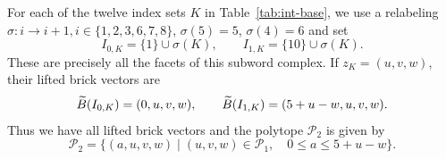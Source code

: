 For each of the twelve index sets $K$ in Table~\ref{tab:int-base}, we use
a relabeling $\sigma:i\to i+1, i\in\{1,2,3,6,7,8\}$, $\sigma(5)=5$, $\sigma(4)=6$ and set
\[
I_{0,K}=\{1\}\cup\sigma(K),\qquad
I_{1,K}=\{10\}\cup\sigma(K).
\]
These are precisely all the facets of this subword complex. If $z_K=(u,v,w)$, their lifted
brick vectors are
\begin{equation}\label{eq:int-small-vertices}
\widetilde B(I_{0,K})=(0,u,v,w),\qquad
\widetilde B(I_{1,K})=(5+u-w,u,v,w).
\end{equation}
Thus we have all lifted brick vectors and the polytope $\mathcal P_2$ is given by
\begin{equation}\label{eq:int-small-polytope}
\mathcal P_2=\{(a,u,v,w)\mid (u,v,w)\in\mathcal P_1,\quad
0\leq a\leq5+u-w\}.
\end{equation}

